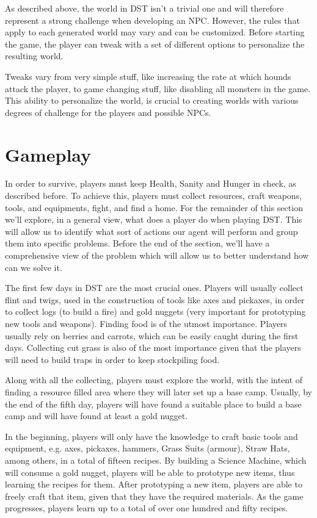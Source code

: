 As described above, the world in \ac{DST} isn't a trivial one and will therefore represent a strong challenge when developing an \ac{NPC}.
However, the rules that apply to each generated world may vary and can be customized.
Before starting the game, the player can tweak with a set of different options to personalize the resulting world.

Tweaks vary from very simple stuff, like increasing the rate at which hounds attack the player, to game changing stuff, like disabling all monsters in the game.
This ability to personalize the world, is crucial to creating worlds with various degrees of challenge for the players and possible \ac{NPC}s.

\section{Gameplay}

\noindent In order to survive, players must keep Health, Sanity and Hunger in check, as described before.
To achieve this, players must collect resources, craft weapons, tools, and equipments, fight, and find a home.
For the remainder of this section we'll explore, in a general view, what does a player do when playing \ac{DST}.
This will allow us to identify what sort of actions our agent will perform and group them into specific problems.
Before the end of the section, we'll have a comprehensive view of the problem which will allow us to better understand how can we solve it.

The first few days in \ac{DST} are the most crucial ones.
Players will usually collect flint and twigs, used in the construction of tools like axes and pickaxes, in order to collect logs (to build a fire) and gold nuggets (very important for prototyping new tools and weapons).
Finding food is of the utmost importance. 
Players usually rely on berries and carrots, which can be easily caught during the first days.
Collecting cut grass is also of the most importance given that the players will need to build traps in order to keep stockpiling food.

Along with all the collecting, players must explore the world, with the intent of finding a resource filled area where they will later set up a base camp.
Usually, by the end of the fifth day, players will have found a suitable place to build a base camp and will have found at least a gold nugget.

In the beginning, players will only have the knowledge to craft basic tools and equipment, e.g. axes, pickaxes, hammers, Grass Suits (armour), Straw Hats, among others, in a total of fifteen recipes.
By building a Science Machine, which will consume a gold nugget, players will be able to prototype new items, thus learning the recipes for them.
After prototyping a new item, players are able to freely craft that item, given that they have the required materials.
As the game progresses, players learn up to a total of over one hundred and fifty recipes.

